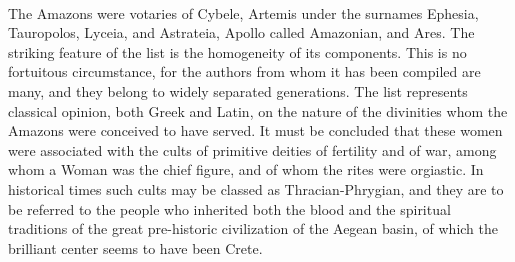 \documentclass[a4paper, 12pt, oneside]{article}
\begin{document}
\paragraph{}
The Amazons were votaries of Cybele, Artemis under the surnames Ephesia, Tauropolos, Lyceia, and Astrateia, Apollo called Amazonian, and Ares. The striking feature of the list is the homogeneity of its components. This is no fortuitous circumstance, for the authors from whom it has been compiled are many, and they belong to widely separated generations. The list represents classical opinion, both Greek and Latin, on the nature of the divinities whom the Amazons were conceived to have served. It must be concluded that these women were associated with the cults of primitive deities of fertility and of war, among whom a Woman was the chief figure, and of whom the rites were orgiastic. In historical times such cults may be classed as Thracian-Phrygian, and they are to be referred to the people who inherited both the blood and the spiritual traditions of the great pre-historic civilization of the Aegean basin, of which the brilliant center seems to have been Crete.
\end{document}

